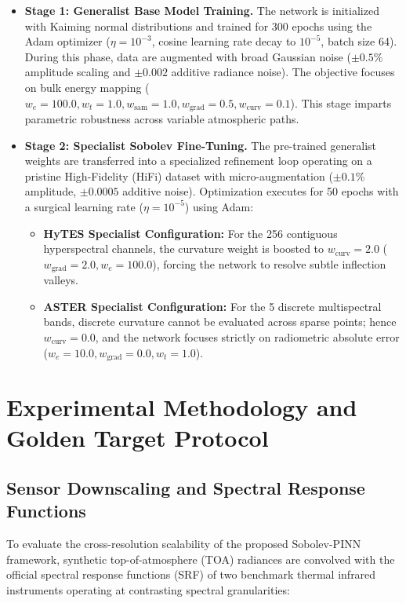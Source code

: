 \documentclass[journal]{IEEEtran}
\begin{document}
\begin{itemize}
    \item \textbf{Stage 1: Generalist Base Model Training.}  
    The network is initialized with Kaiming normal distributions and trained for 300 epochs using the Adam optimizer ($\eta = 10^{-3}$, cosine learning rate decay to $10^{-5}$, batch size 64). During this phase, data are augmented with broad Gaussian noise ($\pm 0.5\%$ amplitude scaling and $\pm 0.002$ additive radiance noise). The objective focuses on bulk energy mapping ($w_e = 100.0, w_t = 1.0, w_{\text{sam}} = 1.0, w_{\text{grad}} = 0.5, w_{\text{curv}} = 0.1$). This stage imparts parametric robustness across variable atmospheric paths.
    
    \item \textbf{Stage 2: Specialist Sobolev Fine-Tuning.}  
    The pre-trained generalist weights are transferred into a specialized refinement loop operating on a pristine High-Fidelity (HiFi) dataset with micro-augmentation ($\pm 0.1\%$ amplitude, $\pm 0.0005$ additive noise). Optimization executes for 50 epochs with a surgical learning rate ($\eta = 10^{-5}$) using Adam:
    \begin{itemize}
        \item \textbf{HyTES Specialist Configuration:} For the 256 contiguous hyperspectral channels, the curvature weight is boosted to $w_{\text{curv}} = 2.0$ ($w_{\text{grad}} = 2.0, w_e = 100.0$), forcing the network to resolve subtle inflection valleys.
        \item \textbf{ASTER Specialist Configuration:} For the 5 discrete multispectral bands, discrete curvature cannot be evaluated across sparse points; hence $w_{\text{curv}} = 0.0$, and the network focuses strictly on radiometric absolute error ($w_e = 10.0, w_{\text{grad}} = 0.0, w_t = 1.0$).
    \end{itemize}
\end{itemize}

\section{Experimental Methodology and Golden Target Protocol}

\subsection{Sensor Downscaling and Spectral Response Functions}
To evaluate the cross-resolution scalability of the proposed Sobolev-PINN framework, synthetic top-of-atmosphere (TOA) radiances are convolved with the official spectral response functions (SRF) of two benchmark thermal infrared instruments operating at contrasting spectral granularities:
\end{document}
